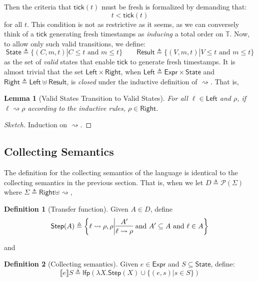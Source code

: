 \documentclass[acmsmall,review]{acmart}\settopmatter{printfolios=true,printccs=false,printacmref=false}
\theoremstyle{definition}
\newtheorem{defn}{Definition}[section]
\theoremstyle{plain}
\newtheorem{lem}{Lemma}[section]
\newcommand*{\pset}{\mathcal{P}}
\newcommand*{\Expr}{\mathsf{Expr}}
\newcommand*{\Time}{\mathbb{T}}
\newcommand*{\Left}{\mathsf{Left}}
\newcommand*{\Right}{\mathsf{Right}}
\newcommand*{\mem}{m}
\newcommand*{\State}{\mathsf{State}}
\newcommand*{\Result}{\mathsf{Result}}
\newcommand*{\lfp}{\mathsf{lfp}}
\newcommand*{\semarrow}{\rightsquigarrow}
\newcommand*{\sembracket}[1]{\lBrack{#1}\rBrack}
\newcommand*{\tick}{\mathsf{tick}}
\begin{document}
Then the criteria that $\tick(t)$ must be fresh is formalized by demanding that:
\[t < \tick(t)\]
for all $t$.
This condition is not as restrictive as it seems, as we can conversely think of a $\tick$ generating fresh timestamps as \emph{inducing} a total order on $\Time$.
Now, to allow only such valid transitions, we define:
\[
  \State\triangleq\{(C,\mem,t)|C\le t\text{ and }\mem\le t\}\qquad
  \Result\triangleq\{(V,\mem,t)|V\le t\text{ and }\mem\le t\}
\]
as the set of \emph{valid} states that enable $\tick$ to generate fresh timestamps.
It is almost trivial that the set $\Left\times\Right$, when $\Left\triangleq\Expr\times\State$ and $\Right\triangleq\Left\uplus\Result$, is \emph{closed} under the inductive definition of $\semarrow$.
That is,
\begin{lem}[Valid States Transition to Valid States]
  For all $\ell\in\Left$ and $\rho$, if $\ell\semarrow\rho$ according to the inductive rules, $\rho\in\Right$.
\end{lem}
\begin{proof}[Sketch]
  Induction on $\semarrow$.
\end{proof}

\subsection{Collecting Semantics}
The definition for the collecting semantics of the language is identical to the collecting semantics in the previous section.
That is, when we let $D\triangleq\pset(\Sigma)$ where $\Sigma\triangleq\Right\uplus\semarrow$,
\begin{defn}[Transfer function]
  Given $A\in D$, define
  \[
    \mathsf{Step}(A)\triangleq
    \left\{\ell\semarrow\rho, \rho\middle|
    \begin{prooftree}[center=true]
      \hypo{A'}\infer1{\ell\semarrow\rho}
    \end{prooftree}\text{ and }
    A'\subseteq A\text{ and }\ell\in A
    \right\}
  \]
\end{defn}
and
\begin{defn}[Collecting semantics]
  Given $e\in\Expr$ and $S\subseteq\State$, define:
  \[
    \sembracket{e}S\triangleq\lfp(\lambda X.\mathsf{Step}(X)\cup\{(e,s)|s\in S\})
  \]
\end{defn}
\end{document}
